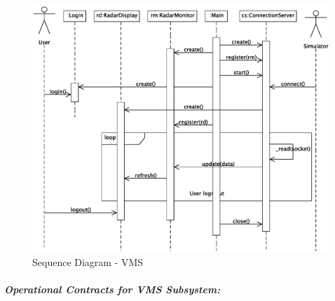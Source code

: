 \documentclass{article}
\begin{document}
\begin{figure}[!htb]
\caption{Sequence Diagram - VMS}
\centering
\includegraphics[scale=0.6]{diagrams/vms-sequence-diagram.eps}
\end{figure}

\subparagraph{Operational Contracts for VMS Subsystem:}
\end{document}
